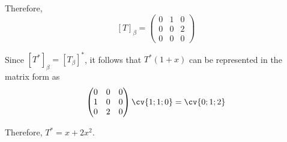 \documentclass[11pt]{scrartcl}
\begin{document}
Therefore,
\[[T]_{\beta} = 
\begin{pmatrix}
0 & 1 & 0\\
0 & 0 & 2\\
0 & 0 & 0 
\end{pmatrix}\]

Since \([T^{*}]_{\beta} = [T_{\beta}]^{*}\), it follows that
\(T^{*}(1+x)\) can be represented in the matrix form as
\[\begin{pmatrix}
0 & 0 & 0\\
1 & 0 & 0\\
0 & 2 & 0 
\end{pmatrix}\cv{1;1;0}=\cv{0;1;2}\]

Therefore, \(T^{*} =x+2x^2\).
\end{document}
